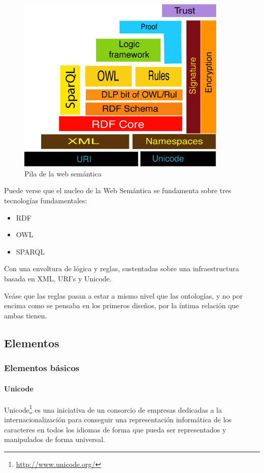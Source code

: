 \begin{figure}[ht]
	\centering
	\includegraphics[width=10cm]{images/semantic-web-stack.png}
	\caption{Pila de la web semántica}
	\label{fig:swStack}
\end{figure}

Puede verse que el nucleo de la Web Semántica se fundamenta sobre tres 
tecnologías fundamentales:

\begin{itemize}
  \item RDF
  \item OWL
  \item SPARQL
\end{itemize}

Con una envoltura de lógica y reglas, sustentadas sobre una infraestructura 
basada en XML, URI's y Unicode.

Veáse que las reglas pasan a estar a mismo nivel que las ontologías, y no por
encima como se pensaba en los primeros diseños, por la íntima relación que ambas
tienen.

\subsection{Elementos}

\subsubsection{Elementos básicos}

\paragraph{Unicode}

Unicode\footnote{\url{http://www.unicode.org/}} es una iniciativa de un consorcio de 
empresas dedicadas a la internacionalización para conseguir una representación 
informática de los caracteres en todos los idiomas de forma que pueda ser representados
y manipulados de forma universal. 

